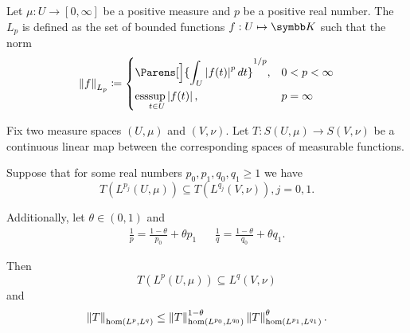 \begin{definition}\label{def:lebesgue_space}\cite[6]{Bergh1976}
  Let \( \mu: U \to [0, \infty] \) be a positive measure and \( p \) be a positive real number. The  \( L_p \) is defined as the set of bounded functions \( f: U \mapsto \BK \) such that the norm
  \begin{equation*}
    \Norm{f}_{L_p} \coloneqq \begin{dcases}
      \Parens[\Big]{\int_U \Abs{f(t)}^p dt}^{1/p}, &0 < p < \infty \\
      \Ess\sup_{t \in U} \Abs{f(t)} , &p = \infty
    \end{dcases}
  \end{equation*}
\end{definition}

\begin{theorem}\label{thm:riesz_thorin}
  Fix two measure spaces \( (U, \mu) \) and \( (V, \nu) \). Let \( T: S(U, \mu) \to S(V, \nu) \) be a continuous linear map between the corresponding spaces of measurable functions.

  Suppose that for some real numbers \( p_0, p_1, q_0, q_1 \geq 1 \) we have
  \begin{equation*}
    T(L^{p_j}(U, \mu)) \subseteq T(L^{q_j}(V, \nu)), j = 0, 1.
  \end{equation*}

  Additionally, let \( \theta \in (0, 1) \) and
  \begin{align*}
    \frac 1 p = \frac {1 - \theta} {p_0} + {\theta} {p_1}
    &&
    \frac 1 q = \frac {1 - \theta} {q_0} + {\theta} {q_1}.
  \end{align*}

  Then
  \begin{equation*}
    T(L^p(U, \mu)) \subseteq L^q(V, \nu)
  \end{equation*}
  and
  \begin{equation*}
    \left\Vert T \right\Vert_{\operatorname{hom}(L^p, L^q)} \leq \left\Vert T \right\Vert_{\operatorname{hom}(L^{p_0}, L^{q_0})}^{1 - \theta} \left\Vert T \right\Vert_{\operatorname{hom}(L^{p_1}, L^{q_1})}^\theta.
  \end{equation*}
\end{theorem}

